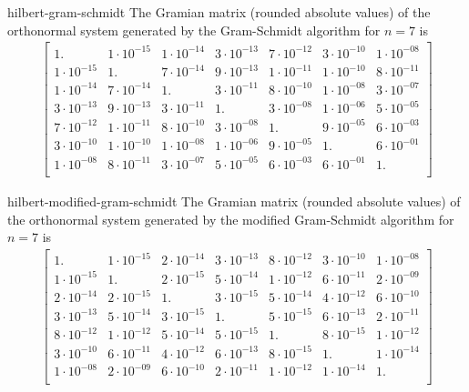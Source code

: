 \begin{Example}{hilbert-gram-schmidt}
  The Gramian matrix (rounded absolute values) of the orthonormal system generated by the
  Gram-Schmidt algorithm for $n=7$ is\small
  \begin{gather*}
    \begin{bmatrix}
      1. & 1\cdot 10^{-15} & 1\cdot 10^{-14} & 3\cdot 10^{-13} & 7\cdot 10^{-12} & 3\cdot 10^{-10} & 1\cdot 10^{-08}\\
      1\cdot 10^{-15} & 1. & 7\cdot 10^{-14} & 9\cdot 10^{-13} & 1\cdot 10^{-11} & 1\cdot 10^{-10} & 8\cdot 10^{-11}\\
      1\cdot 10^{-14} & 7\cdot 10^{-14} & 1. & 3\cdot 10^{-11} & 8\cdot 10^{-10} & 1\cdot 10^{-08} & 3\cdot 10^{-07}\\
      3\cdot 10^{-13} & 9\cdot 10^{-13} & 3\cdot 10^{-11} & 1. & 3\cdot 10^{-08} & 1\cdot 10^{-06} & 5\cdot 10^{-05}\\
      7\cdot 10^{-12} & 1\cdot 10^{-11} & 8\cdot 10^{-10} & 3\cdot 10^{-08} & 1. & 9\cdot 10^{-05} & 6\cdot 10^{-03}\\
      3\cdot 10^{-10} & 1\cdot 10^{-10} & 1\cdot 10^{-08} & 1\cdot 10^{-06} & 9\cdot 10^{-05} & 1. & 6\cdot 10^{-01}\\
      1\cdot 10^{-08} & 8\cdot 10^{-11} & 3\cdot 10^{-07} & 5\cdot 10^{-05} & 6\cdot 10^{-03} & 6\cdot 10^{-01} & 1.\\
    \end{bmatrix}
  \end{gather*}
\end{Example}

\begin{Example}{hilbert-modified-gram-schmidt}
  The Gramian matrix (rounded absolute values) of the orthonormal system generated by the
  modified Gram-Schmidt algorithm for $n=7$ is\small
  \begin{gather*}
    \begin{bmatrix}
      1. & 1\cdot 10^{-15} & 2\cdot 10^{-14} & 3\cdot 10^{-13} & 8\cdot 10^{-12} & 3\cdot 10^{-10} & 1\cdot 10^{-08}\\
      1\cdot 10^{-15} & 1. & 2\cdot 10^{-15} & 5\cdot 10^{-14} & 1\cdot 10^{-12} & 6\cdot 10^{-11} & 2\cdot 10^{-09}\\
      2\cdot 10^{-14} & 2\cdot 10^{-15} & 1. & 3\cdot 10^{-15} & 5\cdot 10^{-14} & 4\cdot 10^{-12} & 6\cdot 10^{-10}\\
      3\cdot 10^{-13} & 5\cdot 10^{-14} & 3\cdot 10^{-15} & 1. & 5\cdot 10^{-15} & 6\cdot 10^{-13} & 2\cdot 10^{-11}\\
      8\cdot 10^{-12} & 1\cdot 10^{-12} & 5\cdot 10^{-14} & 5\cdot 10^{-15} & 1. & 8\cdot 10^{-15} & 1\cdot 10^{-12}\\
      3\cdot 10^{-10} & 6\cdot 10^{-11} & 4\cdot 10^{-12} & 6\cdot 10^{-13} & 8\cdot 10^{-15} & 1. & 1\cdot 10^{-14}\\
      1\cdot 10^{-08} & 2\cdot 10^{-09} & 6\cdot 10^{-10} & 2\cdot 10^{-11} & 1\cdot 10^{-12} & 1\cdot 10^{-14} & 1.\\
    \end{bmatrix}
  \end{gather*}
\end{Example}

